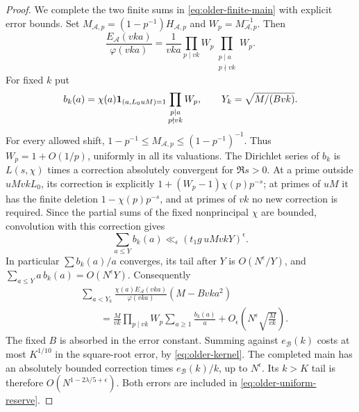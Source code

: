 \begin{proof}
We complete the two finite sums in
\eqref{eq:older-finite-main} with explicit error bounds.
Set \(M_{\mathcal A,p}=(1-p^{-1})H_{\mathcal A,p}\) and
\(W_p=M_{\mathcal A,p}^{-1}\).
Then
\[
 \frac{E_{\mathcal A}(vka)}{\varphi(vka)}
   =\frac1{vka}\prod_{p\mid vk}W_p
                    \prod_{\substack{p\mid a\\p\nmid vk}}W_p.
\]
For fixed \(k\) put
\[
 b_k(a)=\chi(a)\mathbf 1_{(a,L_0uM)=1}
                       \prod_{\substack{p\mid a\\p\nmid vk}}W_p,
 \qquad Y_k=\sqrt{M/(Bvk)}.
\]
For every allowed shift,
\(1-p^{-1}\le M_{\mathcal A,p}\le(1-p^{-1})^{-1}\).
Thus \(W_p=1+O(1/p)\), uniformly in all its valuations.
The Dirichlet series of \(b_k\) is \(L(s,\chi)\) times a correction
absolutely convergent for \(\Re s>0\).
At a prime outside \(uMvkL_0\), its correction is explicitly
\(1+(W_p-1)\chi(p)p^{-s}\); at primes of \(uM\) it has the finite
deletion \(1-\chi(p)p^{-s}\), and at primes of \(vk\) no new
correction is required.
Since the partial sums of the fixed nonprincipal \(\chi\) are
bounded, convolution with this correction gives
\[
 \sum_{a\le Y}b_k(a)\ll_\epsilon
                 (t_1g\,uMvkY)^\epsilon .
\]
In particular \(\sum b_k(a)/a\) converges, its tail after \(Y\)
is \(O(N^\epsilon/Y)\), and
\(\sum_{a\le Y}a\,b_k(a)=O(N^\epsilon Y)\).
Consequently
\[
 \begin{split}
 &\sum_{a<Y_k}
 \frac{\chi(a)E_{\mathcal A}(vka)}{\varphi(vka)}
                                      (M-Bvka^2)\\
 &\qquad=
 \frac{M}{vk}\prod_{p\mid vk}W_p
                       \sum_{a\ge1}\frac{b_k(a)}a
        +O_\epsilon\!\left(N^\epsilon\sqrt{\frac{M}{vk}}\right).
 \end{split}
\]
The fixed \(B\) is absorbed in the error constant.
Summing against \(e_{\mathcal B}(k)\) costs at most \(K^{1/10}\)
in the square-root error, by \eqref{eq:older-kernel}.
The completed main has an absolutely bounded correction times
\(e_{\mathcal B}(k)/k\), up to \(N^\epsilon\).
Its \(k>K\) tail is therefore
\(O(N^{1-2\lambda/5+\epsilon})\).
Both errors are included in \eqref{eq:older-uniform-reserve}.


\end{proof}
